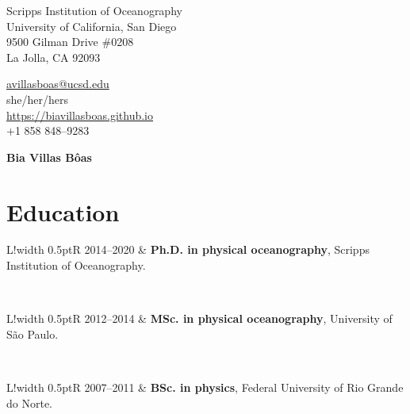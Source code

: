 \documentclass[10pt]{article}
\newcommand\VRule{\color{lightgray}\vrule width 0.5pt}
\begin{document}
\pagestyle{empty}
\begin{minipage}[ht]{0.48\textwidth}
\begin{flushleft}
\small{Scripps Institution of Oceanography} \\
\small{University of California, San Diego}\\
\small{9500 Gilman Drive \#0208} \\
\small{La Jolla, CA 92093} \\
\end{flushleft}
\end{minipage}
\hfill
\begin{minipage}[ht]{0.35\textwidth}
\begin{flushleft}
\noindent \href{mailto:avillasboas@ucsd.edu}{avillasboas@ucsd.edu}  \\
she/her/hers  \\
{\url{https://biavillasboas.github.io} } \\
\small{+1 858 848--9283}  \\
\end{flushleft}
\end{minipage}


\vspace{.5cm}
\begin{center}
	{\bfseries\Huge Bia Villas B\^{o}as}
\end{center}
\vspace{.5cm}

\section*{Education}
\vspace{.3cm}
\begin{tabular}{L!{\VRule}R}
\textsc{2014--2020} & \textbf{Ph.D. in physical oceanography}, Scripps Institution of Oceanography. \\ 
\end{tabular}
\\[10pt]
\begin{tabular}{L!{\VRule}R}
	\textsc{2012--2014} & \textbf{MSc. in physical oceanography}, University of S\~{a}o Paulo. \\ 
\end{tabular}
\\[10pt]
\begin{tabular}{L!{\VRule}R}
\textsc{2007--2011} & \textbf{BSc. in physics}, Federal University of Rio Grande do Norte. \\
\end{tabular}
\end{document}
